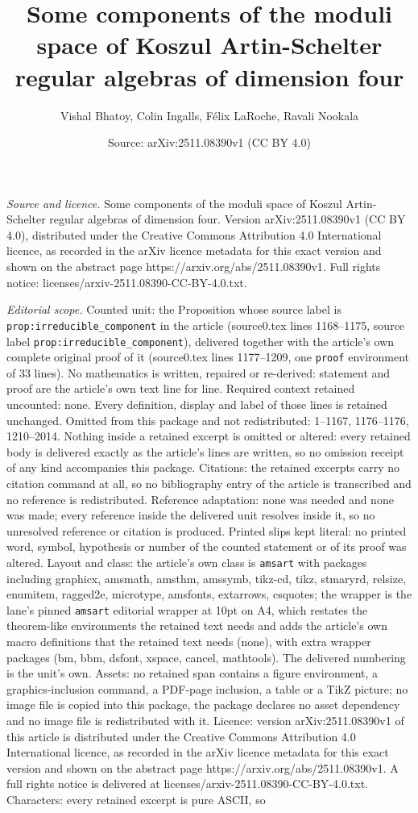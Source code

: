 \documentclass[10pt,a4paper]{amsart}
\title[Some components of the moduli space of Koszul Artin-Schelter]{Some components of the moduli space of Koszul Artin-Schelter regular algebras of dimension four}
\author{Vishal Bhatoy, Colin Ingalls, F\'elix LaRoche, Ravali Nookala}
\date{Source: arXiv:2511.08390v1 (CC BY 4.0)}
\begin{document}
\maketitle

\noindent\emph{Source and licence.} Some components of the moduli space of Koszul Artin-Schelter regular algebras of dimension four. Version arXiv:2511.08390v1 (CC BY 4.0), distributed under the Creative Commons Attribution 4.0 International licence, as recorded in the arXiv licence metadata for this exact version and shown on the abstract page https://arxiv.org/abs/2511.08390v1. Full rights notice: licenses/arxiv-2511.08390-CC-BY-4.0.txt.\par\smallskip

\noindent\textit{Editorial scope.} Counted unit: the Proposition whose source label is \texttt{prop:irreducible\_component} in the article (source0.tex lines 1168--1175, source label \texttt{prop:irreducible\_component}), delivered together with the article's own complete original proof of it (source0.tex lines 1177--1209, one \texttt{proof} environment of 33 lines). No mathematics is written, repaired or re-derived: statement and proof are the article's own text line for line. Required context retained uncounted: none. Every definition, display and label of those lines is retained unchanged. Omitted from this package and not redistributed: 1--1167, 1176--1176, 1210--2014. Nothing inside a retained excerpt is omitted or altered: every retained body is delivered exactly as the article's lines are written, so no omission receipt of any kind accompanies this package. Citations: the retained excerpts carry no citation command at all, so no bibliography entry of the article is transcribed and no reference is redistributed. Reference adaptation: none was needed and none was made; every reference inside the delivered unit resolves inside it, so no unresolved reference or citation is produced. Printed slips kept literal: no printed word, symbol, hypothesis or number of the counted statement or of its proof was altered. Layout and class: the article's own class is \texttt{amsart} with packages including graphicx, amsmath, amsthm, amssymb, tikz-cd, tikz, stmaryrd, relsize, enumitem, ragged2e, microtype, amsfonts, extarrows, csquotes; the wrapper is the lane's pinned \texttt{amsart} editorial wrapper at 10pt on A4, which restates the theorem-like environments the retained text needs and adds the article's own macro definitions that the retained text needs (none), with extra wrapper packages (bm, bbm, dsfont, xspace, cancel, mathtools). The delivered numbering is the unit's own. Assets: no retained span contains a figure environment, a graphics-inclusion command, a PDF-page inclusion, a table or a TikZ picture; no image file is copied into this package, the package declares no asset dependency and no image file is redistributed with it. Licence: version arXiv:2511.08390v1 of this article is distributed under the Creative Commons Attribution 4.0 International licence, as recorded in the arXiv licence metadata for this exact version and shown on the abstract page https://arxiv.org/abs/2511.08390v1. A full rights notice is delivered at licenses/arxiv-2511.08390-CC-BY-4.0.txt. Characters: every retained excerpt is pure ASCII, so 
\end{document}
